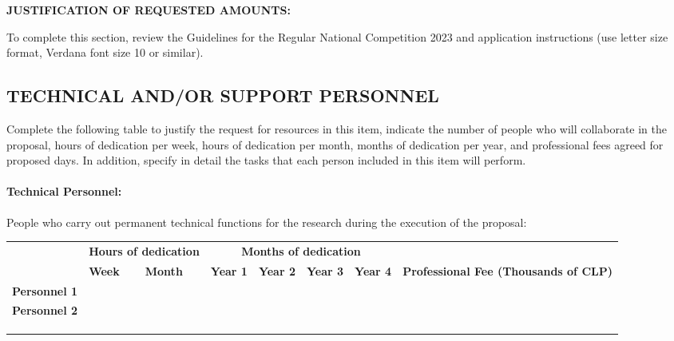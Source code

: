 \documentclass[MAIN.tex]{subfiles}
\begin{document}
\noindent\textbf{JUSTIFICATION OF REQUESTED AMOUNTS:}

\noindent To complete this section, review the Guidelines for the Regular National Competition 2023 and application instructions (use letter size format, Verdana font size 10 or similar).

\subsection*{\uppercase{Technical and/or support personnel}}

Complete the following table to justify the request for resources in this item, indicate the number of people who will collaborate in the proposal, hours of dedication per week, hours of dedication per month, months of dedication per year, and professional fees agreed for proposed days. In addition, specify in detail the tasks that each person included in this item will perform.

\paragraph*{Technical Personnel:} People who carry out permanent technical functions for the research during the execution of the proposal:

\medskip

\noindent\begin{tabularx}{\linewidth}{|m{.26\linewidth}|X|X|X|X|X|X|m{.20\linewidth}|}
\hline
\cellcolor{tcc}
& \multicolumn{2}{c|}{\cellcolor{tcc}\begin{minipage}{.14\linewidth}\centering\textbf{Hours of dedication}\vspace{3pt}\end{minipage}}
& \multicolumn{4}{c|}{\cellcolor{tcc}\textbf{Months of dedication}}
& \cellcolor{tcc}
\tabularnewline
\hhline{|>{\arrayrulecolor{tcc}}->{\arrayrulecolor{black}}|------>{\arrayrulecolor{tcc}}->{\arrayrulecolor{black}}}
\multirow{-2}{*}{\cellcolor{tcc}\textbf{Technical personnel}}
& \cellcolor{tcc}\centering\small\textbf{Week}
& \cellcolor{tcc}\centering\small\textbf{Month}
& \cellcolor{tcc}\centering\small\textbf{Year 1}
& \cellcolor{tcc}\centering\small\textbf{Year 2}
& \cellcolor{tcc}\centering\small\textbf{Year 3}
& \cellcolor{tcc}\centering\small\textbf{Year 4}
& \multirow{-2}{.20\textwidth}{\cellcolor{tcc}\centering\textbf{Professional Fee (Thousands of CLP)}}
\tabularnewline
\hline
\textbf{Personnel 1} & & & & & & & \\\hline
\textbf{Personnel 2} & & & & & & & \\\hline
 & & & & & & & \\\hline
 & & & & & & & \\\hline
 & & & & & & & \\\hline
\end{tabularx}
\end{document}
